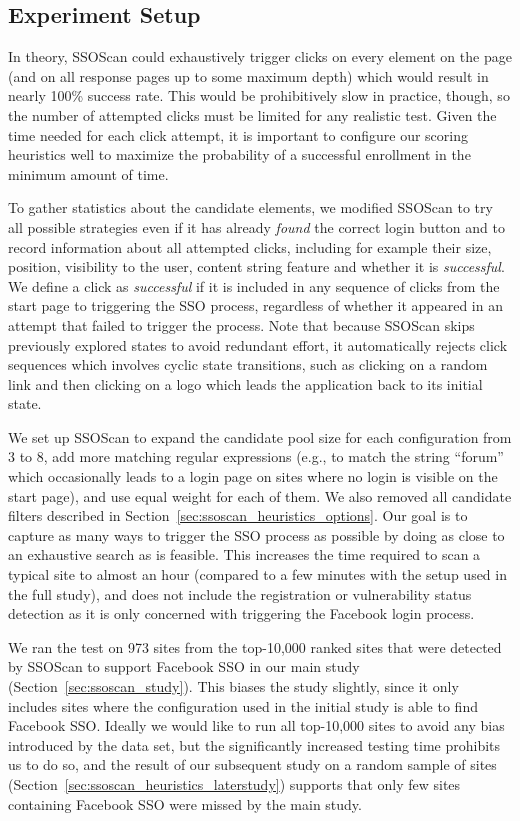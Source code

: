 \subsection{Experiment Setup}
\label{sec:ssoscan_heuristics_heuristicsEval}

In theory, SSOScan could exhaustively trigger clicks on every element on the page (and on all response pages up to some maximum depth) which would result in nearly 100\% success rate.  This would be prohibitively slow in practice, though, so the number of attempted clicks must be limited for any realistic test.  Given the time needed for each click attempt, it is important to configure our scoring heuristics well to maximize the probability of a successful enrollment in the minimum amount of time.  

To gather statistics about the candidate elements, we modified SSOScan to try all possible strategies even if it has already \emph{found} the correct login button and to record information about all attempted clicks, including for example their size, position, visibility to the user, content string feature and whether it is \emph{successful}.  We define a click as \emph{successful} if it is included in any sequence of clicks from the start page to triggering the SSO process, regardless of whether it appeared in an attempt that failed to trigger the process.  Note that because SSOScan skips previously explored states to avoid redundant effort, it automatically rejects click sequences which involves cyclic state transitions, such as clicking on a random link and then clicking on a logo which leads the application back to its initial state.

We set up SSOScan to expand the candidate pool size for each configuration from 3 to 8, add more matching regular expressions (e.g., to match the string ``forum'' which occasionally leads to a login page on sites where no login is visible on the start page), and use equal weight for each of them.  We also removed all candidate filters described in Section~\ref{sec:ssoscan_heuristics_options}.  Our goal is to capture as many ways to trigger the SSO process as possible by doing as close to an exhaustive search as is feasible.  This increases the time required to scan a typical site to almost an hour (compared to a few minutes with the setup used in the full study), and does not include the registration or vulnerability status detection as it is only concerned with triggering the Facebook login process.

We ran the test on 973 sites from the top-10,000 ranked sites that were detected by SSOScan to support Facebook SSO in our main study (Section~\ref{sec:ssoscan_study}).  This biases the study slightly, since it only includes sites where the configuration used in the initial study is able to find Facebook SSO.  Ideally we would like to run all top-10,000 sites to avoid any bias introduced by the data set, but the significantly increased testing time prohibits us to do so, and the result of our subsequent study on a random sample of sites (Section~\ref{sec:ssoscan_heuristics_laterstudy}) supports that only few sites containing Facebook SSO were missed by the main study.

